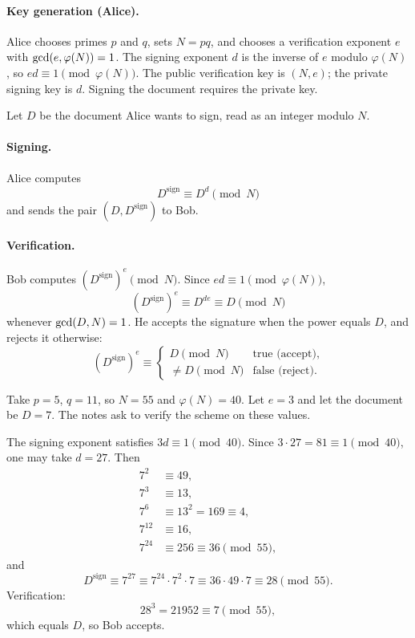 \begin{keybox}[title=RSA signatures]
\paragraph{Key generation (Alice).}
Alice chooses primes $p$ and $q$, sets $N=pq$, and chooses a verification
exponent $e$ with $\operatorname{gcd}(e,\varphi(N))=1$. The signing exponent $d$ is
the inverse of $e$ modulo $\varphi(N)$, so $ed\equiv 1\pmod{\varphi(N)}$.
The public verification key is $(N,e)$; the private signing key is $d$.
Signing the document requires the private key.


Let $D$ be the document Alice wants to sign, read as an integer modulo $N$.

\paragraph{Signing.}
Alice computes
\[
    D^{\mathrm{sign}}\equiv D^{d}\pmod{N}
\]
and sends the pair $(D,D^{\mathrm{sign}})$ to Bob.

\paragraph{Verification.}
Bob computes $(D^{\mathrm{sign}})^{e}\pmod{N}$. Since
$ed\equiv 1\pmod{\varphi(N)}$,
\[
    (D^{\mathrm{sign}})^{e}
    \equiv D^{de}
    \equiv D\pmod{N}
\]
whenever $\operatorname{gcd}(D,N)=1$. He accepts the signature when the power equals
$D$, and rejects it otherwise:
\[
    (D^{\mathrm{sign}})^{e}
    \equiv
    \begin{cases}
        D\pmod{N} & \text{true (accept)},\\
        \neq D\pmod{N} & \text{false (reject)}.
    \end{cases}
\]
\end{keybox}

\begin{example}
Take $p=5$, $q=11$, so $N=55$ and $\varphi(N)=40$. Let $e=3$ and let the
document be $D=7$. The notes ask to verify the scheme on these values.

The signing exponent satisfies $3d\equiv 1\pmod{40}$. Since
$3\cdot 27=81\equiv 1\pmod{40}$, one may take $d=27$. Then
\begin{align*}
    7^{2}&\equiv 49,\\
    7^{3}&\equiv 13,\\
    7^{6}&\equiv 13^{2}=169\equiv 4,\\
    7^{12}&\equiv 16,\\
    7^{24}&\equiv 256\equiv 36\pmod{55},
\end{align*}
and
\[
    D^{\mathrm{sign}}
    \equiv 7^{27}
    \equiv 7^{24}\cdot 7^{2}\cdot 7
    \equiv 36\cdot 49\cdot 7
    \equiv 28\pmod{55}.
\]
Verification:
\[
    28^{3}=21952\equiv 7\pmod{55},
\]
which equals $D$, so Bob accepts.
\end{example}


